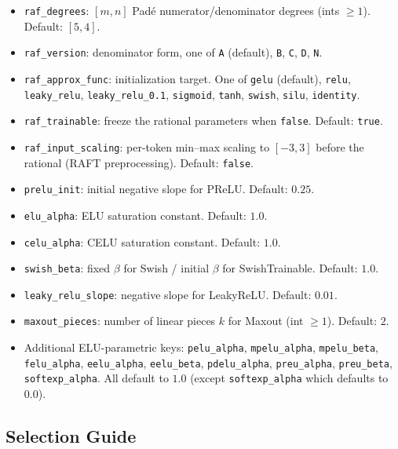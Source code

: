 \begin{itemize}[leftmargin=*]
  \item \texttt{raf\_degrees}: $[m,n]$ Pad\'e numerator/denominator degrees
    (ints $\ge 1$). Default: $[5,4]$.
  \item \texttt{raf\_version}: denominator form, one of
    \texttt{A} (default), \texttt{B}, \texttt{C}, \texttt{D}, \texttt{N}.
  \item \texttt{raf\_approx\_func}: initialization target. One of
    \texttt{gelu} (default), \texttt{relu}, \texttt{leaky\_relu},
    \texttt{leaky\_relu\_0.1}, \texttt{sigmoid}, \texttt{tanh},
    \texttt{swish}, \texttt{silu}, \texttt{identity}.
  \item \texttt{raf\_trainable}: freeze the rational parameters when
    \texttt{false}. Default: \texttt{true}.
  \item \texttt{raf\_input\_scaling}: per-token min--max scaling to $[-3,3]$
    before the rational (RAFT preprocessing). Default: \texttt{false}.
  \item \texttt{prelu\_init}: initial negative slope for PReLU. Default: $0.25$.
  \item \texttt{elu\_alpha}: ELU saturation constant. Default: $1.0$.
  \item \texttt{celu\_alpha}: CELU saturation constant. Default: $1.0$.
  \item \texttt{swish\_beta}: fixed $\beta$ for Swish / initial $\beta$ for
    SwishTrainable. Default: $1.0$.
  \item \texttt{leaky\_relu\_slope}: negative slope for LeakyReLU.
    Default: $0.01$.
  \item \texttt{maxout\_pieces}: number of linear pieces $k$ for Maxout
    (int $\ge 1$). Default: $2$.
  \item Additional ELU-parametric keys:
    \texttt{pelu\_alpha}, \texttt{mpelu\_alpha}, \texttt{mpelu\_beta},
    \texttt{felu\_alpha}, \texttt{eelu\_alpha}, \texttt{eelu\_beta},
    \texttt{pdelu\_alpha}, \texttt{preu\_alpha}, \texttt{preu\_beta},
    \texttt{softexp\_alpha}. All default to $1.0$ (except
    \texttt{softexp\_alpha} which defaults to $0.0$).
\end{itemize}

\subsection{Selection Guide}

